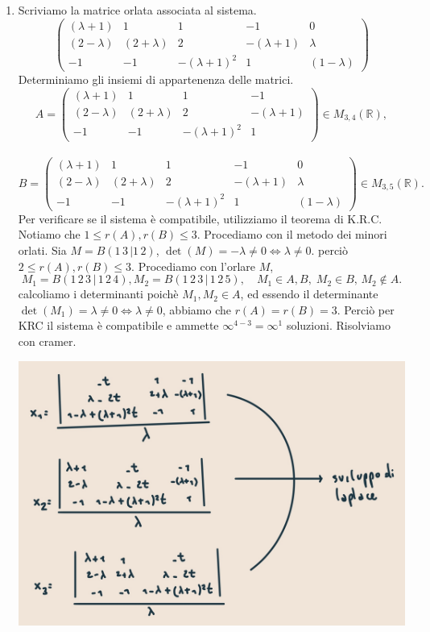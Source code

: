 \documentclass{article}
\theoremstyle{plain}
\theoremstyle{definition}
\theoremstyle{remark}
\begin{document}
\begin{enumerate}
    \item 
    Scriviamo la matrice orlata associata al sistema. 
    \[\begin{pmatrix}
        (\lambda+1)&1&1&-1&0\\
        (2-\lambda)&(2+\lambda)&2&-(\lambda+1)&\lambda\\
        -1&-1&-(\lambda+1)^2&1&(1-\lambda)
    \end{pmatrix}\]
    Determiniamo gli insiemi di appartenenza delle matrici.
    \[A=\begin{pmatrix}
        (\lambda+1)&1&1&-1\\
        (2-\lambda)&(2+\lambda)&2&-(\lambda+1)\\
        -1&-1&-(\lambda+1)^2&1
    \end{pmatrix}\in M_{3,4}(\mathbb{R}),\]\\
    \[B=\begin{pmatrix}
        (\lambda+1)&1&1&-1&0\\
        (2-\lambda)&(2+\lambda)&2&-(\lambda+1)&\lambda\\
        -1&-1&-(\lambda+1)^2&1&(1-\lambda)
    \end{pmatrix}\in M_{3,5}(\mathbb{R}).
    \]
    Per verificare se il sistema è compatibile, utilizziamo il teorema di K.R.C.
    Notiamo che $1\leq r(A),r(B)\leq 3 $. 
    Procediamo con il metodo dei minori orlati. 
    Sia $M=B(1\,3\,|1\,2)$, $\det(M)=-\lambda\neq0 \iff \lambda\neq0$.
    perciò $2\leq r(A),r(B)\leq 3 $. 
    Procediamo con l'orlare $M$, 
    \[M_1=B(1\,2\,3\,|\,1\,2\,4), M_2=B(1\,2\,3\,|\,1\,2\,5),\quad M_1\in A,B,\;M_2\in B,\,M_2\notin A.\]
    calcoliamo i determinanti poichè $M_1,M_2\in A$, ed essendo il determinante $\det(M_1)=\lambda\neq0\iff \lambda\neq0$, 
    abbiamo che $r(A)=r(B)=3$. Perciò per KRC il sistema è compatibile e ammette $\infty^{4-3}=\infty^1$ soluzioni.
    Risolviamo con cramer.
    \begin{center}
    \includegraphics[scale=0.2]{crameruno.jpg}    

\end{center}
\end{enumerate}
\end{document}
